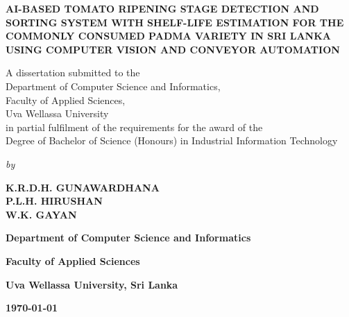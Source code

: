 \begin{titlepage}
    \centering

    \textbf{\Large AI-BASED TOMATO RIPENING STAGE DETECTION AND SORTING SYSTEM WITH SHELF-LIFE ESTIMATION FOR THE COMMONLY CONSUMED PADMA VARIETY IN SRI LANKA USING COMPUTER VISION AND CONVEYOR AUTOMATION}

    \vfill

    \begin{center}
        A dissertation submitted to the \\
        Department of Computer Science and Informatics, \\
        Faculty of Applied Sciences, \\
        Uva Wellassa University \\
        in partial fulfilment of the requirements for the award of the \\
        Degree of Bachelor of Science (Honours) in Industrial Information Technology
    \end{center}

    \vfill

    \textit{by}

    \begin{center}
        \textbf{\large K.R.D.H. GUNAWARDHANA} \\
        \textbf{\large P.L.H. HIRUSHAN} \\
        \textbf{\large W.K. GAYAN} \\
    \end{center}

    \vfill

    \textbf{\large Department of Computer Science and Informatics}

    \textbf{\large Faculty of Applied Sciences}

    \textbf{\large Uva Wellassa University, Sri Lanka}

    \vspace{0.5cm}

    \textbf{\large \monthyeardate\today}
\end{titlepage}
